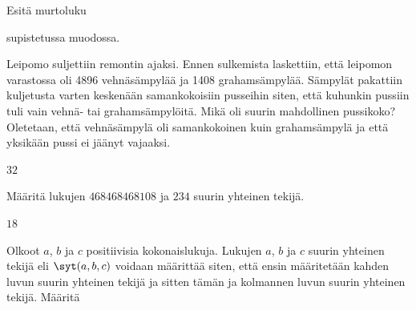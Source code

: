 \begin{tehtava}
    Esitä murtoluku
    \begin{alakohdat}
    \end{alakohdat}
    supistetussa muodossa.

    \begin{vastaus}
        \begin{alakohdat}
        \end{alakohdat}
    \end{vastaus}
    
\end{tehtava}

\begin{tehtava}
    Leipomo suljettiin remontin ajaksi. Ennen sulkemista laskettiin, että leipomon varastossa oli 4896 vehnäsämpylää ja 1408 grahamsämpylää. Sämpylät pakattiin kuljetusta varten keskenään samankokoisiin pusseihin siten, että kuhunkin pussiin tuli vain vehnä- tai grahamsämpylöitä. Mikä oli suurin mahdollinen pussikoko? Oletetaan, että vehnäsämpylä oli samankokoinen kuin grahamsämpylä ja että yksikään pussi ei jäänyt vajaaksi.

    \begin{vastaus}
        $32$
    \end{vastaus}
    
\end{tehtava}

\begin{tehtava}
    Määritä lukujen $468468468108$ ja $234$ suurin yhteinen tekijä.
    
    \begin{vastaus}
        $18$
    \end{vastaus}
    
\end{tehtava}

\begin{tehtava}
    Olkoot $a$, $b$ ja $c$ positiivisia kokonaislukuja. Lukujen $a$, $b$ ja $c$ suurin yhteinen tekijä eli $\syt(a, b, c)$ voidaan määrittää siten, että ensin määritetään kahden luvun suurin yhteinen tekijä ja sitten tämän ja kolmannen luvun suurin yhteinen tekijä. Määritä
    
    \begin{alakohdat}
    \end{alakohdat}

    \begin{vastaus}
        \begin{alakohdat}
        \end{alakohdat}
    \end{vastaus}
    
\end{tehtava}


